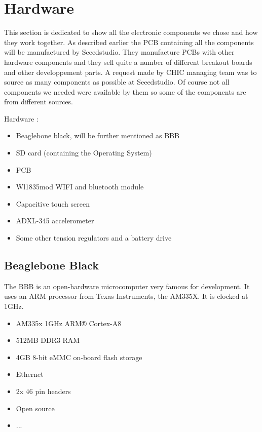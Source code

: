 \section{Hardware}
This section is dedicated to show all the electronic components we chose and how they work together. As described earlier the PCB containing all the components will be manufactured by Seeedstudio. They manufacture PCBs with other hardware components and they sell quite a number of different breakout boards and other developpement parts. A request made by CHIC managing team was to source as many components as possible at Seeedstudio. Of course not all components we needed were available by them so some of the components are from different sources.

Hardware :
\begin{itemize}
\item{Beaglebone black, will be further mentioned as BBB}
\item{SD card (containing the Operating System)}
\item{PCB}
\item{Wl1835mod WIFI and bluetooth module}
\item{Capacitive touch screen}
\item{ADXL-345 accelerometer}
\item{Some other tension regulators and a battery drive}
\end{itemize}

\subsection{Beaglebone Black}
The BBB is an open-hardware microcomputer very famous for development. It uses an ARM processor from Texas Instruments, the AM335X. It is clocked at 1GHz.
\begin{itemize}
  \item{ AM335x 1GHz ARM® Cortex-A8 }
  \item{512MB DDR3 RAM}
  \item{4GB 8-bit eMMC on-board flash storage}
  \item{Ethernet}
  \item{2x 46 pin headers}
  \item{Open source}
  \item{...}
\end{itemize}



